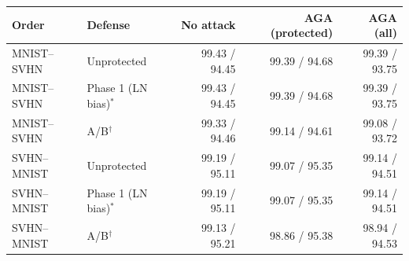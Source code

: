 \begin{tabular}{llrrr}
\toprule
Order & Defense & No attack & AGA (protected) & AGA (all) \\
\midrule
MNIST--SVHN & Unprotected & 99.43 / 94.45 & 99.39 / 94.68 & 99.39 / 93.75 \\
MNIST--SVHN & Phase 1 (LN bias)$^{*}$ & 99.43 / 94.45 & 99.39 / 94.68 & 99.39 / 93.75 \\
MNIST--SVHN & A/B$^{\dagger}$ & 99.33 / 94.46 & 99.14 / 94.61 & 99.08 / 93.72 \\
SVHN--MNIST & Unprotected & 99.19 / 95.11 & 99.07 / 95.35 & 99.14 / 94.51 \\
SVHN--MNIST & Phase 1 (LN bias)$^{*}$ & 99.19 / 95.11 & 99.07 / 95.35 & 99.14 / 94.51 \\
SVHN--MNIST & A/B$^{\dagger}$ & 99.13 / 95.21 & 98.86 / 95.38 & 98.94 / 94.53 \\
\bottomrule
\end{tabular}
